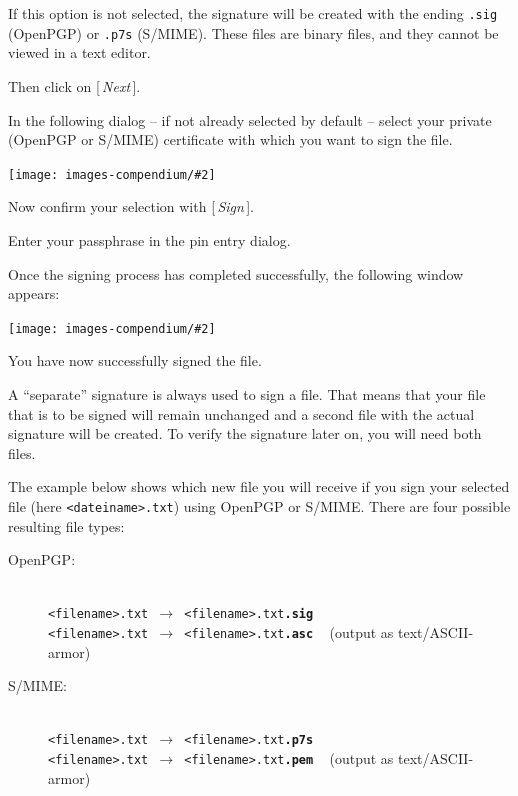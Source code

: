 \documentclass[a4paper,11pt,oneside,openright,titlepage]{scrbook}
\newcommand{\Button}[1]{[\,\textit{#1}\,]}
\newcommand{\Filename}[1]{\small{\texttt{#1}}\normalsize}
\newcommand{\IncludeImage}[2][]{
\begin{center}
  \texttt{[image: images-compendium/\#2]}%
\end{center}
}
\begin{document}
If this option is not selected, the signature will be created with the
ending \Filename{.sig} (OpenPGP) or \Filename{.p7s} (S/MIME).  These
files are binary files, and they cannot be viewed in a text editor.

Then click on \Button{Next}.

\clearpage
In the following dialog -- if not already selected by default --
select your private (OpenPGP or S/MIME) certificate with which you
want to sign the file.

\IncludeImage[width=0.85\textwidth]{sc-kleopatra-signFile2_en}

Now confirm your selection with \Button{Sign}.

Enter your passphrase in the pin entry dialog.

\clearpage
Once the signing process has completed successfully, the following
window appears:

\IncludeImage[width=0.85\textwidth]{sc-kleopatra-signFile3_en}

You have now successfully signed the file.

A ``separate'' signature is always used to sign a file. That means
that your file that is to be signed will remain unchanged and a second
file with the actual signature will be created. To verify the
signature later on, you will need both files.

The example below shows which new file you will receive if you sign
your selected file (here \Filename{<dateiname>.txt}) using OpenPGP or
S/MIME. There are four possible resulting file types:


\begin{description}
    \item[OpenPGP:]~\\
    \Filename{<filename>.txt $\rightarrow$ <filename>.txt\textbf{.sig}}\\
    \Filename{<filename>.txt $\rightarrow$ <filename>.txt\textbf{.asc}}
    ~ \small (output as text/ASCII-armor)
    \normalsize

    \item[S/MIME:]~\\
    \Filename{<filename>.txt $\rightarrow$ <filename>.txt\textbf{.p7s}}\\
    \Filename{<filename>.txt $\rightarrow$ <filename>.txt\textbf{.pem}}
    ~ \small{ (output as text/ASCII-armor)}
    \normalsize
\end{description}
\end{document}
